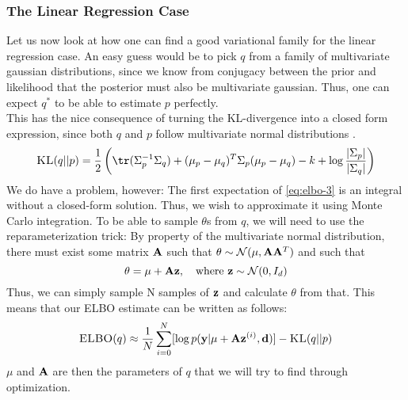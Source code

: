 \subsubsection{The Linear Regression Case}
Let us now look at how one can find a good variational family for the linear regression case.
An easy guess would be to pick $q$ from a family of multivariate gaussian distributions, since we know from conjugacy between the prior and likelihood that the posterior must also be multivariate gaussian.
Thus, one can expect $q^*$ to be able to estimate $p$ perfectly.\\
This has the nice consequence of turning the KL-divergence into a closed form expression, since both $q$ and $p$ follow multivariate normal distributions \cite{kld-gaussian}.\\
\begin{equation}\textsc{KL}(q || p) = \frac{1}{2}\left(\tr (\Sigma_p^{-1}\Sigma_q) + (\mu_p -\mu_q)^T\Sigma_p(\mu_p - \mu_q) - k + \log \frac{|\Sigma_p|}{|\Sigma_q|}\right)\end{equation}
We do have a problem, however: The first expectation of \eqref{eq:elbo-3} is an integral without a closed-form solution.
Thus, we wish to approximate it using Monte Carlo integration. 
To be able to sample $\theta$s from $q$, we will need to use the reparameterization trick:
By property of the multivariate normal distribution, there must exist some matrix $\mathbf{A}$ such that $\theta \sim \mathcal{N}(\mu, \mathbf{A} \mathbf{A}^T)$ \cite{krause22}
and such that
\begin{equation}\theta = \mu + \B{A}\B{z}, \quad \textrm{where}\ \B{z}\sim \mathcal{N}(0,I_d)\end{equation}
Thus, we can simply sample N samples of $\mathbf{z}$ and calculate $\theta$ from that. 
This means that our ELBO estimate can be written as follows:
\begin{equation}\textsc{ELBO}(q) \approx \frac{1}{N}\sum_{i=0}^N [\log p(\mathbf{y} | \mu + \mathbf{A}\mathbf{z}^{(i)}, \mathbf{d})] - \textsc{KL}(q || p)\label{eq:final-elbo}\end{equation}
$\mu$ and $\mathbf{A}$ are then the parameters of $q$ that we will try to find through optimization.
